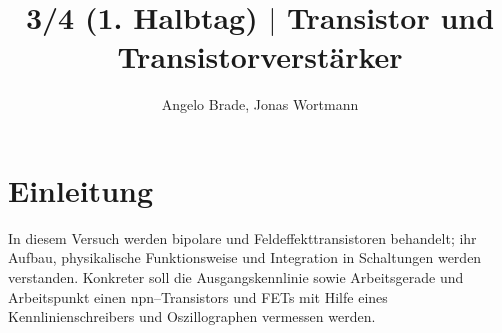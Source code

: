 \documentclass[a4paper,12pt]{article}
\numberwithin{equation}{section}
\begin{document}

\title{3/4 (1. Halbtag) $|$ Transistor und Transistorverstärker}
\author{Angelo Brade, Jonas Wortmann}
\maketitle
{}


\newpage


\fancyhead[L]{\thepage}
\fancyfoot[C]{}

\tableofcontents


\newpage


\fancyhead[R]{\leftmark}

\section{Einleitung}
In diesem Versuch werden bipolare und Feldeffekttransistoren behandelt; ihr Aufbau, physikalische Funktionsweise und Integration in Schaltungen werden verstanden.
Konkreter soll die Ausgangskennlinie sowie Arbeitsgerade und Arbeitspunkt einen npn--Transistors und FETs mit Hilfe eines Kennlinienschreibers und Oszillographen vermessen werden.

\clearpage
\end{document}
